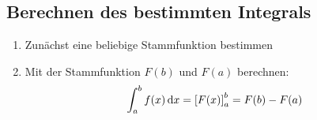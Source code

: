 \subsection{Berechnen des bestimmten Integrals}
\begin{enumerate}\itemsep0em
	\item Zunächst eine beliebige Stammfunktion bestimmen
	\item Mit der Stammfunktion $F(b)$ und $F(a)$ berechnen:
	\begin{equation*}
		\int_{a}^{b} f(x) \,\mathrm dx = \left[ F(x) \right]_a^b = F(b) - F(a)
	\end{equation*}
\end{enumerate}

